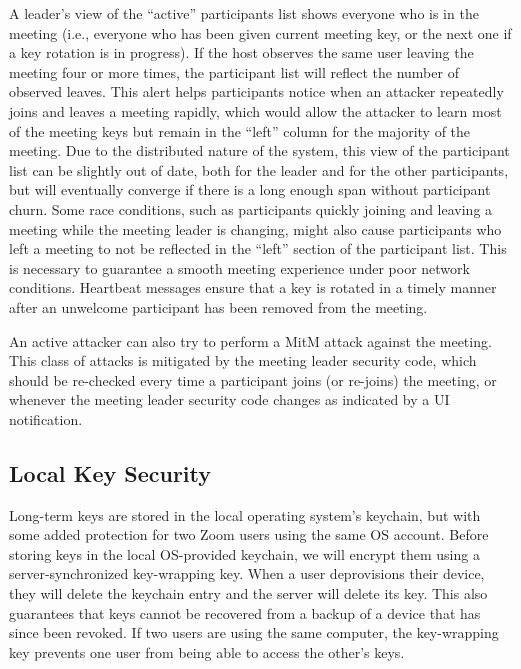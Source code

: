 A leader's view of the ``active'' participants list shows everyone who is in the meeting
(i.e., everyone who has been given current meeting key, or the next one if a key rotation is in
progress). If the host observes the same user leaving the meeting four or more times, the participant
list will reflect the number of observed leaves. This alert helps participants notice when an attacker repeatedly joins and leaves a meeting rapidly, which would allow the attacker to learn most of the meeting keys but remain in the ``left'' column for the majority of the meeting. Due to the distributed nature of the
system, this view of the participant list can be slightly out of date, both for the leader and for
the other participants, but will eventually converge if there is a long enough span without
participant churn. Some race conditions, such as participants quickly joining and leaving a meeting
while the meeting leader is changing, might also cause participants who left a meeting to not be
reflected in the ``left'' section of the participant list. This is necessary to guarantee a smooth
meeting experience under poor network conditions. Heartbeat messages ensure that a key is rotated in
a timely manner after an unwelcome participant has been removed from the meeting.

An active attacker can also try to perform a MitM attack against the meeting. This class of attacks
is mitigated by the meeting leader security code, which should be re-checked every time a
participant joins (or re-joins) the meeting, or whenever the meeting leader security code changes as
indicated by a UI notification. 

\subsection{Local Key Security}
\label{subsec:lks}

Long-term keys are stored in the local operating system's keychain, but with some added protection
for two Zoom users using the same OS account.
%
Before storing keys in the local OS-provided keychain, we will encrypt them using a server-synchronized key-wrapping key.
%
When a user deprovisions their device, they will delete the keychain entry and the server will
delete its key. This also guarantees that keys cannot be recovered from a backup of a device that
has since been revoked.
%
If two users are using the same computer, the key-wrapping key prevents one user from being able to access the other's keys.

